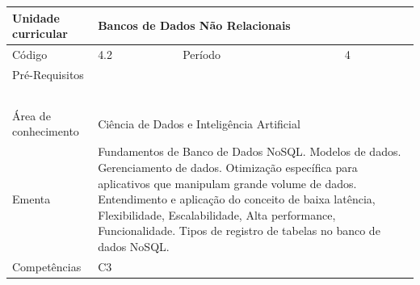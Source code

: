 \clearpage
\newpage

\begin{quadro}[ht!]
  \centering\scriptsize
\caption{Unidade Curricular Bancos de Dados Não Relacionais}

\begin{tabular}{|p{2.5cm}|p{2.5cm}|p{2.5cm}|p{2.5cm}|p{2.5cm}|}\hline

  Unidade curricular & \multicolumn{4}{p{10cm}|}{ Bancos de Dados Não Relacionais }\\\hline
  Código & 4.2 & Período & \multicolumn{2}{p{5cm}|}{ 4 }\\\hline
  Pré-Requisitos & \multicolumn{4}{p{10cm}|}{  } \\\hline
  \cellcolor{blue1}{ CH PRESENCIAL } &
    \cellcolor{blue1}{CH EAD Síncrona} &
    \cellcolor{blue1}{CH EAD Síncrona Mediada} &
    \cellcolor{blue1}{CH EAD Assíncrona} &
    \cellcolor{blue1}{CH APCC} \\\hline
  \cellcolor{blue1}{ 30 } &
    \cellcolor{blue1}{ 0 } &
    \cellcolor{blue1}{ 0 } &
    \cellcolor{blue1}{ 30 } &
    \cellcolor{blue1}{0} \\\hline
  \cellcolor{blue1}{ CH Teórica } &
    \cellcolor{blue1}{CH Prática} &
    \cellcolor{blue1}{CH Humanidades} &
    \cellcolor{blue1}{CH Extensão} &
    \cellcolor{blue1}{CH EAD TOTAL} \\\hline
  \cellcolor{blue1}{ 30 } &
    \cellcolor{blue1}{ 30 } &
    \cellcolor{blue1}{ 0 } &
    \cellcolor{blue1}{ 0 } &
    \cellcolor{blue1}{ 30 } \\\hline
  \cellcolor{blue1}{CARGA-HORÁRIA TOTAL} & \multicolumn{4}{p{10cm}|}{ \cellcolor{blue1}{ 60 } } \\\hline
  Área de conhecimento & \multicolumn{4}{p{10cm}|}{ Ciência de Dados e Inteligência Artificial } \\\hline
  Ementa & \multicolumn{4}{p{10cm}|}{ Fundamentos de Banco de Dados NoSQL. Modelos de dados. Gerenciamento de dados. Otimização específica para aplicativos que manipulam grande volume de dados. Entendimento e aplicação do conceito de baixa latência, Flexibilidade, Escalabilidade, Alta performance, Funcionalidade. Tipos de registro de tabelas no banco de dados NoSQL. } \\\hline
  Competências & \multicolumn{4}{p{10cm}|}{ C3 } \\\hline


  
	\end{tabular}

\end{quadro}


